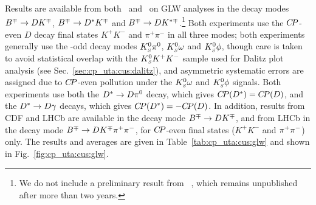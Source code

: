 \label{sec:cp_uta:cus:glw}

Results are available from both \babar\ and \belle\ on GLW analyses in the
decay modes $B^\mp \to DK^\mp$, $B^\mp \to D^*K^\mp$ and 
$B^\mp \to DK^{*\mp}$.\footnote{
  We do not include a preliminary result from \belle~\cite{Abe:2003rg}, which
  remains unpublished after more than two years.
}
Both experiments use the $C\!P$-even $D$ decay final states $K^+K^-$ and
$\pi^+\pi^-$ in all three modes; both experiments generally use the \CP-odd
decay modes $K^0_{\scriptscriptstyle S}\pi^0$, $K^0_{\scriptscriptstyle S}\omega$ and $K^0_{\scriptscriptstyle S}\phi$, though care is taken to
avoid statistical overlap with the $K^0_{\scriptscriptstyle S} K^+K^-$ sample used for Dalitz plot
analysis (see Sec.~\ref{sec:cp_uta:cus:dalitz}), 
and asymmetric systematic errors are assigned due to $C\!P$-even pollution
under the $K^0_{\scriptscriptstyle S}\omega$ and $K^0_{\scriptscriptstyle S}\phi$ signals.
Both experiments use both the $D^* \to D\pi^0$ decay, 
which gives $C\!P(D^*) = C\!P(D)$,
and the $D^* \to D\gamma$ decays, 
which gives $C\!P(D^*) = -C\!P(D)$.
In addition, results from CDF and LHCb are available in the
decay mode $B^\mp \to DK^\mp$, 
and from LHCb in the decay mode $B^\mp \to DK^\mp\pi^+\pi^-$, 
for $C\!P$-even final states ($K^+K^-$ and $\pi^+\pi^-$) only.
The results and averages are given in Table~\ref{tab:cp_uta:cus:glw}
and shown in Fig.~\ref{fig:cp_uta:cus:glw}.



